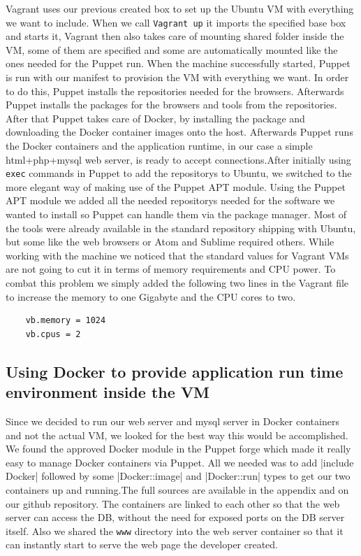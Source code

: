 Vagrant uses our previous created \gls{box} to set up the Ubuntu \gls{VM} with everything we want to include. When we call \verb|Vagrant up| it imports the specified base \gls{box} and starts it, Vagrant then also takes care of mounting shared folder inside the \gls{VM}, some of them are specified and some are automatically mounted like the ones needed for the Puppet run. When the machine successfully started, Puppet is run with our manifest to provision the \gls{VM} with everything we want. In order to do this, Puppet installs the repositories needed for the browsers. Afterwards Puppet installs the packages for the browsers and tools from the repositories. After that Puppet takes care of Docker, by installing the package and downloading the Docker container images onto the host. Afterwards Puppet runs the Docker containers and the application runtime, in our case a simple html+php+mysql web server, is ready to accept connections.After initially using \verb|exec| commands in Puppet to add the \glspl{repository} to Ubuntu, we switched to the more elegant way of making use of the Puppet APT module. Using the Puppet APT module we added all the needed \glspl{repository} needed for the software we wanted to install so Puppet can handle them via the package manager. Most of the tools were already available in the standard \gls{repository} shipping with Ubuntu, but some like the web browsers or Atom and Sublime required others.
While working with the machine we noticed that the standard values for Vagrant \glspl{VM} are not going to cut it in terms of memory requirements and CPU power. To combat this problem we simply added the following two lines in the Vagrant file to increase the memory to one Gigabyte and the CPU cores to two.

\begin{verbatim}
	vb.memory = 1024
	vb.cpus = 2
\end{verbatim}

\subsection{Using Docker to provide application run time environment inside the \gls{VM}}
Since we decided to run our web server and mysql server in Docker containers and not the actual \gls{VM}, we looked for the best way this would be accomplished. We found the approved Docker module in the Puppet forge which made it really easy to manage Docker containers via Puppet. All we needed was to add |include Docker| followed by some |Docker::image| and |Docker::run| types to get our two containers up and running.The full sources are available in the appendix and on our github repository. The containers are linked to each other so that the web server can access the DB, without the need for exposed ports on the DB server itself. Also we shared the \verb|www| directory into the web server container so that it can instantly start to serve the web page the developer created.

